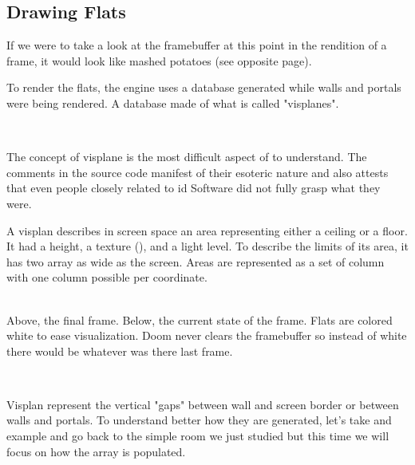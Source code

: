\subsection{Drawing Flats}
 If we were to take a look at the framebuffer at this point in the rendition of a frame, it would look like mashed potatoes (see opposite page).\\
\par
To render the flats, the engine uses a database generated while walls and portals were being rendered. A database made of what is called "visplanes".\\
\par
{}\\
\par
The concept of visplane is the most difficult aspect of \doom to understand. The comments in the source code manifest of their esoteric nature and also attests that even people closely related to id Software did not fully grasp what they were.\\
\par
A visplan describes in screen space an area representing either a ceiling or a floor. It had a height, a texture (), and a light level. To describe the limits of its area, it has two array as wide as the screen. Areas are represented as a set of column with one column possible per  coordinate.\\
\par


\\
Above, the final frame. Below, the current state of the frame. Flats are colored white to ease visualization. Doom never clears the framebuffer so instead of white there would be whatever was there last frame.\\
\par


\\
\par
Visplan represent the vertical "gaps" between wall and screen border or between walls and portals. 
To understand better how they are generated, let's take and example and go back to the simple room we just studied but this time we will focus on how the  array is populated.\\
\par

